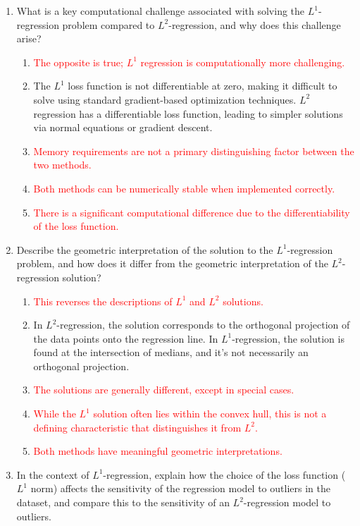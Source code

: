 \documentclass{article}%
\newcommand{\incorrect}[1]{\textcolor{red}{#1}}
\begin{document}
\begin{enumerate}
\begin{enumerate}
\end{enumerate}%
\vspace{1em}%
\item What is a key computational challenge associated with solving the $L^1$-regression problem compared to $L^2$-regression, and why does this challenge arise?%
\begin{enumerate}%
\item \incorrect{The opposite is true; $L^1$ regression is computationally more challenging.}%
\item The $L^1$ loss function is not differentiable at zero, making it difficult to solve using standard gradient-based optimization techniques.  $L^2$ regression has a differentiable loss function, leading to simpler solutions via normal equations or gradient descent.%
\item \incorrect{Memory requirements are not a primary distinguishing factor between the two methods.}%
\item \incorrect{Both methods can be numerically stable when implemented correctly.}%
\item \incorrect{There is a significant computational difference due to the differentiability of the loss function.}%
\end{enumerate}%
\vspace{1em}%
\item Describe the geometric interpretation of the solution to the $L^1$-regression problem, and how does it differ from the geometric interpretation of the $L^2$-regression solution?%
\begin{enumerate}%
\item \incorrect{This reverses the descriptions of $L^1$ and $L^2$ solutions.}%
\item In $L^2$-regression, the solution corresponds to the orthogonal projection of the data points onto the regression line.  In $L^1$-regression, the solution is found at the intersection of medians, and it's not necessarily an orthogonal projection.%
\item \incorrect{The solutions are generally different, except in special cases.}%
\item \incorrect{While the $L^1$ solution often lies within the convex hull, this is not a defining characteristic that distinguishes it from $L^2$.}%
\item \incorrect{Both methods have meaningful geometric interpretations.}%
\end{enumerate}%
\vspace{1em}%
\item In the context of $L^1$-regression, explain how the choice of the loss function ($L^1$ norm) affects the sensitivity of the regression model to outliers in the dataset, and compare this to the sensitivity of an $L^2$-regression model to outliers.%

\end{enumerate}
\end{document}
